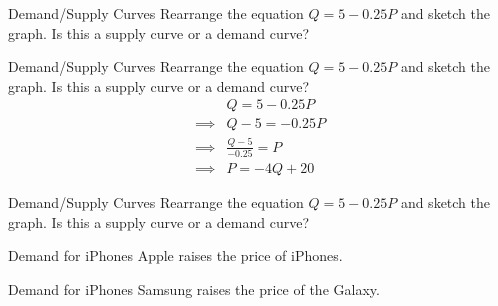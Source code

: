 \documentclass{beamer}
\begin{document}
\begin{frame}[t]{Demand/Supply Curves}
    Rearrange the equation $Q = 5 - 0.25P$ and sketch the graph. Is this a supply curve or a demand curve?
\end{frame}

\begin{frame}[t]{Demand/Supply Curves}
    Rearrange the equation $Q = 5 - 0.25P$ and sketch the graph. Is this a supply curve or a demand curve?
    \[\begin{split}
        &Q = 5 - 0.25P \\
        \implies &Q-5 = -0.25P \\
        \implies &\frac{Q-5}{-0.25} = P \\
        \implies &\boxed{P = -4Q + 20}
    \end{split}\]
\end{frame}

\begin{frame}[t]{Demand/Supply Curves}
    Rearrange the equation $Q = 5 - 0.25P$ and sketch the graph. Is this a supply curve or a demand curve?
\end{frame}

\begin{frame}{Demand for iPhones}
    Apple raises the price of iPhones.
\end{frame}

\begin{frame}{Demand for iPhones}
    Samsung raises the price of the Galaxy.
\end{frame}
\end{document}
